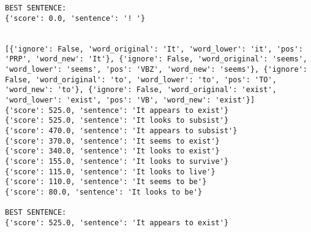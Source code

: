 \documentclass[12pt,a4paper,oneside]{book}
\begin{document}
\begin{verbatim}
BEST SENTENCE:
{'score': 0.0, 'sentence': '! '}


[{'ignore': False, 'word_original': 'It', 'word_lower': 'it', 'pos': 'PRP', 'word_new': 'It'}, {'ignore': False, 'word_original': 'seems', 'word_lower': 'seems', 'pos': 'VBZ', 'word_new': 'seems'}, {'ignore': False, 'word_original': 'to', 'word_lower': 'to', 'pos': 'TO', 'word_new': 'to'}, {'ignore': False, 'word_original': 'exist', 'word_lower': 'exist', 'pos': 'VB', 'word_new': 'exist'}]
{'score': 525.0, 'sentence': 'It appears to exist'}
{'score': 525.0, 'sentence': 'It looks to subsist'}
{'score': 470.0, 'sentence': 'It appears to subsist'}
{'score': 370.0, 'sentence': 'It seems to exist'}
{'score': 340.0, 'sentence': 'It looks to exist'}
{'score': 155.0, 'sentence': 'It looks to survive'}
{'score': 115.0, 'sentence': 'It looks to live'}
{'score': 110.0, 'sentence': 'It seems to be'}
{'score': 80.0, 'sentence': 'It looks to be'}

BEST SENTENCE:
{'score': 525.0, 'sentence': 'It appears to exist'}



\end{verbatim}
\end{document}
